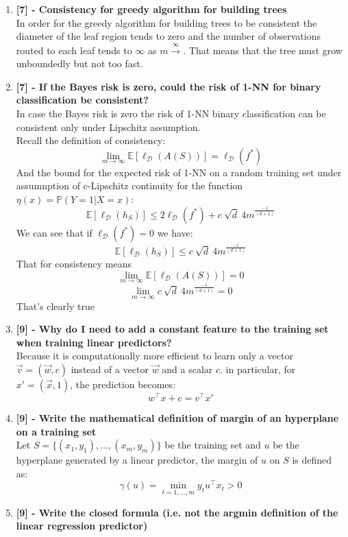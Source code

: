 \documentclass[a4paper]{report}
\begin{document}
\begin{enumerate}
    \item \textbf{[7] - Consistency for greedy algorithm for building trees}\\
    In order for the greedy algorithm for building trees to be consistent the diameter of the leaf region tends to zero and the number of observations routed to each leaf tends to $\infty$ as $m \xrightarrow{\infty}$. That means that the tree must grow unboundedly but not too fast.
    \item \textbf{[7] - If the Bayes risk is zero, could the risk of 1-NN for binary classification be consistent?}\\
    In case the Bayes risk is zero the risk of 1-NN binary classification can be consistent only under Lipschitz assumption.\\
    Recall the definition of consistency:
    $$\lim_{m \to \infty} \mathbb{E} \left[ \ell_{\mathcal{D}}(A(S)) \right] = \ell_{\mathcal{D}}(f^*)$$
    And the bound for the expected risk of 1-NN on a random training set under assumnption of c-Lipschitz continuity for the function $\eta(x) = \mathbb{P}(Y=1 | X = x)$:\\
    $$
    \mathbb{E}[\ell_{\mathcal{D}}(h_{S})] \leq 2\ell_{\mathcal{D}}(f^*) + c\ \sqrt{d} \ 4m^{\frac{-1}{(d+1)}}
    $$
    We can see that if $\ell_{\mathcal{D}}(f^*) = 0$ we have:
    $$
    \mathbb{E}[\ell_{\mathcal{D}}(h_{S})] \leq c\ \sqrt{d} \ 4m^{\frac{-1}{(d+1)}}
    $$
    That for consistency means
    $$\lim_{m \to \infty} \mathbb{E} \left[ \ell_{\mathcal{D}}(A(S)) \right] = 0$$
    $$\lim_{m \to \infty} c\ \sqrt{d} \ 4m^{\frac{-1}{(d+1)}} = 0$$
    That's clearly true\\
    \item \textbf{[9] - Why do I need to add a constant feature to the training set when training linear predictors?}\\
    Because it is computationally more efficient to learn only a vector $\vec{v} = (\vec{w},  c)$ instead of a vector $\vec{w}$ and a scalar $c$. in particular, for $x' = (\vec{x}, 1)$, the prediction becomes: \[w^\top x + c = v^\top x'\]
    \item \textbf{[9] - Write the mathematical definition of margin of an hyperplane on a training set}\\
    Let $S = \{(x_1 , y_1),\dots,(x_m , y_m)\}$ be the training set and $u$ be the hyperplane generated by a linear predictor, the margin of $u$ on $S$ is defined as:
    \[\gamma(u) = \min_{t = 1,\dots ,m}y_t u^\top x_t > 0\]
    \item \textbf{[9] - Write the closed formula (i.e. not the argmin definition of the linear regression predictor)}\\

\end{enumerate}
\end{document}

